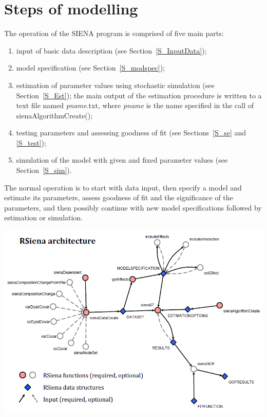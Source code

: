 \documentclass[a4paper,fleqn,11pt]{article}
\newcommand{\+}{\, + \,}
\newcommand{\SI}{{\sf SIENA }}
\begin{document}
\newpage

\section{Steps of modelling}
\label{S_parts}

The operation of the \SI program is comprised of five main parts:
\begin{enumerate}
 \item input of basic data description (see Section~\ref{S_InputData});
 \item model specification (see Section~\ref{S_modspec});
 \item estimation of parameter values using stochastic simulation
        (see Section~\ref{S_Est});
    the main output of the estimation procedure
    is written to a text file named
    \textsf{\textsl{pname}.txt}, where \textsf{\textsl{pname}} is the name
    specified in the call of \textsf{sienaAlgorithmCreate()};
 \item testing parameters and assessing goodness of fit
        (see Sections~\ref{S_se} and \ref{S_test});
 \item simulation of the model with given and fixed parameter values
        (see Section~\ref{S_sim}).
\end{enumerate}

The normal operation is to start with data input, then specify a
model and estimate its parameters,
assess goodness of fit and the significance of the parameters,
and then possibly continue with new
model specifications followed by estimation or simulation.


\vfill
\begin{center}
\includegraphics*[scale=0.7]{RSienaArchitecture.png}
\end{center}
\vfill
\end{document}

